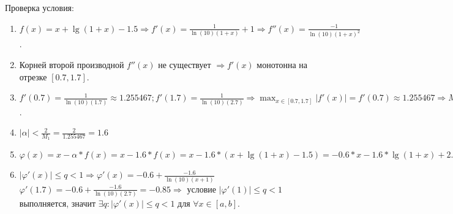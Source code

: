 \documentclass{article}
\begin{document}
	Проверка условия:  
	\begin{enumerate}
		\item $f(x) = x + \lg{(1+x)}-1.5\Rightarrow f'(x) = \frac{1}{\ln(10)(1+x)} +1 \Rightarrow f''(x) = \frac{-1}{\ln(10)(1+x)^2}$.
		\item Корней второй производной $f''(x)$ не существует $ \Rightarrow f'(x)$ монотонна на отрезке $[0.7, 1.7]$.
		\item $f'(0.7) = \frac{1}{\ln(10)(1.7)} \approx 1.255467; f'(1.7) = \frac{1}{\ln(10)(2.7)} \Rightarrow \max_{x \in{[0.7, 1.7]}} |f'(x)| = f'(0.7) \approx 1.255467 \Rightarrow M_1 = 1.255467 $.
		\item $|\alpha| < \frac{2} {M_1} = \frac{2}{1.255467} = 1.6$
		\item $\varphi(x) = x - \alpha*f(x) = x -  1.6 * f(x) = x - 1.6 * (x + \lg{(1+x)}-1.5) = - 0.6*x -1.6*\lg{(1+x)} + 2.4$
		\item $|\varphi'(x)|\leq q<1 \Rightarrow \varphi'(x) = - 0.6 +\frac{-1.6}{\ln(10)(x+1)} $
		~\\
		$\varphi'(1.7) = - 0.6 +\frac{-1.6}{\ln(10)(2.7)} = -0.85 \Rightarrow$ условие $|\varphi'(1)|\leq q<1$ выполняется, значит $\exists q: |\varphi'(x)|\leq q<1$ для $\forall x \in [a, b]$.
	\end{enumerate}
	
\end{document}
